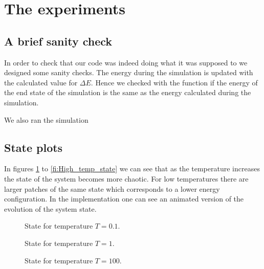 \section{The experiments}

\subsection{A brief sanity check}

In order to check that our code was indeed doing what it was supposed to we designed some sanity checks. 
The energy during the simulation is updated with the calculated value for $\Delta E$.
Hence we checked with the function  if the energy of the end state of the simulation is the same as the energy calculated during the simulation.

We also ran the simulation



\subsection{State plots}

In figures \ref{fi:Low_temp_state} to \ref{fi:High_temp_state} we can see that as the temperature increases the state of the system becomes more chaotic. For low temperatures there are larger patches of the same state which corresponds to a lower energy configuration. In the implementation one can see an animated version of the evolution of the system state.

\begin{figure}
\begin{minipage}{0.25\textwidth}
\centering
\graphicspath{{../../Plots/}}

\caption{State for temperature $T=0.1$.}
\label{fi:High_temp_state}
\end{minipage}
\hfill
\begin{minipage}{0.25\textwidth}
\centering
\graphicspath{{../../Plots/}}

\caption{State for temperature $T=1$.}
\label{fi:Medium_temp_state}
\end{minipage}
\hfill
\begin{minipage}{0.25\textwidth}
\centering
\graphicspath{{../../Plots/}}

\caption{State for temperature $T=100$.}
\label{fi:Low_temp_state}
\end{minipage}
\end{figure}



